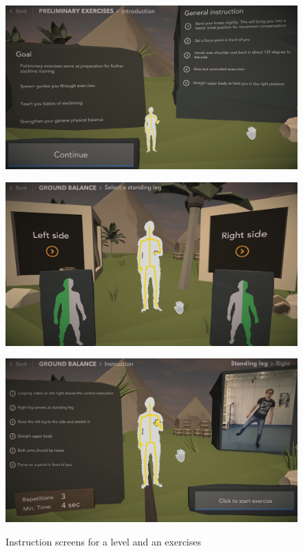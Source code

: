 \begin{figure}[htb]
	\centering
	\begin{minipage}[t]{0.32\linewidth}
		\centering
		\includegraphics[width=1\linewidth]{Pictures/5_Workflow/8_LevelDescription}
		\label{fig:5_3_level_intro}
	\end{minipage}
	\hfill
	\begin{minipage}[t]{0.32\linewidth}
		\centering
		\includegraphics[width=1\linewidth]{Pictures/5_Workflow/9_1_SideSelectionNone}
		\label{fig:5_3_select_side}
	\end{minipage}
	\hfill
	\begin{minipage}[t]{0.32\linewidth}
		\centering
		\includegraphics[width=1\linewidth]{Pictures/5_Workflow/10_ExerciseInstruction}
		\label{fig:5_3_exercise_intro}
	\end{minipage}
	\caption{Instruction screens for a level and an exercises}%
	\label{fig:5_3_introductions}
\end{figure}

